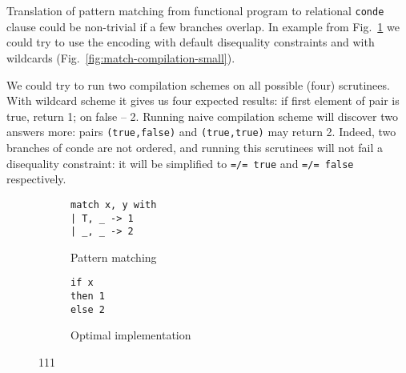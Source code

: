 
\section{\noCanren{}}
\label{sec:noCanren}

Translation of pattern matching from functional program to relational \lstinline|conde| clause could be non-trivial if a few branches overlap. In example from Fig.~\ref{fig:match-example-small} we could try to use the encoding with default disequality constraints and with wildcards (Fig.~\ref{fig:match-compilation-small}).

We could try to run two compilation schemes on all possible (four) scrutinees. With wildcard scheme it gives us four expected results: if first element of pair is true, return 1; on false -- 2. Running naive compilation scheme will discover two answers more: pairs \lstinline|(true,false)| and \lstinline|(true,true)| may return 2. Indeed, two branches of conde are not ordered, and running this scrutinees will not fail a disequality constraint: it will be simplified to \lstinline|=/= true| and \lstinline|=/= false| respectively.


\begin{figure}[ht]
\begin{subfigure}[t]{0.4\linewidth}
\centering
\begin{lstlisting}
match x, y with
| T, _ -> 1
| _, _ -> 2
\end{lstlisting}
\caption{Pattern matching}
\end{subfigure}
\hspace{.5cm}
\begin{subfigure}[t]{0.5\linewidth}
\centering
\begin{lstlisting}
if x 
then 1 
else 2
\end{lstlisting}
\caption{Optimal implementation}
\end{subfigure}
\caption{111} 
\label{fig:match-example-small}
\end{figure}

